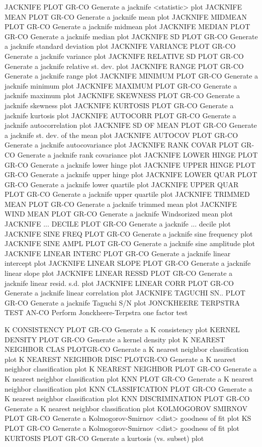JACKNIFE PLOT               GR-CO Generate a jacknife <statistic> plot
JACKNIFE MEAN PLOT          GR-CO Generate a jacknife mean plot
JACKNIFE MIDMEAN PLOT       GR-CO Generate a jacknife midmean plot
JACKNIFE MEDIAN PLOT        GR-CO Generate a jacknife median plot
JACKNIFE SD PLOT            GR-CO Generate a jacknife standard deviation plot
JACKNIFE VARIANCE PLOT      GR-CO Generate a jacknife variance plot
JACKNIFE RELATIVE SD PLOT   GR-CO Generate a jacknife relative st. dev. plot
JACKNIFE RANGE PLOT         GR-CO Generate a jacknife range plot
JACKNIFE MINIMUM PLOT       GR-CO Generate a jacknife minimum plot
JACKNIFE MAXIMUM PLOT       GR-CO Generate a jacknife maximum plot
JACKNIFE SKEWNESS PLOT      GR-CO Generate a jacknife skewness plot
JACKNIFE KURTOSIS PLOT      GR-CO Generate a jacknife kurtosis plot
JACKNIFE AUTOCORR PLOT      GR-CO Generate a jacknife autocorrelation plot
JACKNIFE SD OF MEAN PLOT    GR-CO Generate a jacknife st. dev. of the mean plot
JACKNIFE AUTOCOV PLOT       GR-CO Generate a jacknife autocovariance plot
JACKNIFE RANK COVAR PLOT    GR-CO Generate a jacknife rank covariance plot
JACKNIFE LOWER HINGE PLOT   GR-CO Generate a jacknife lower hinge plot
JACKNIFE UPPER HINGE PLOT   GR-CO Generate a jacknife upper hinge plot
JACKNIFE LOWER QUAR PLOT    GR-CO Generate a jacknife lower quartile plot
JACKNIFE UPPER QUAR PLOT    GR-CO Generate a jacknife upper quartile plot
JACKNIFE TRIMMED MEAN PLOT  GR-CO Generate a jacknife trimmed mean plot
JACKNIFE WIND MEAN PLOT     GR-CO Generate a jacknife Windsorized mean plot
JACKNIFE ... DECILE PLOT    GR-CO Generate a jacknife ... decile plot
JACKNIFE SINE FREQ PLOT     GR-CO Generate a jacknife sine frequency plot
JACKNIFE SINE AMPL PLOT     GR-CO Generate a jacknife sine amplitude plot
JACKNIFE LINEAR INTERC PLOT GR-CO Generate a jacknife linear intercept plot
JACKNIFE LINEAR SLOPE PLOT  GR-CO Generate a jacknife linear slope plot
JACKNIFE LINEAR RESSD PLOT  GR-CO Generate a jacknife linear resid. s.d. plot
JACKNIFE LINEAR CORR PLOT   GR-CO Generate a jacknife linear correlation plot
JACKNIFE TAGUCHI SN.. PLOT  GR-CO Generate a jacknife Taguchi S/N plot
JONCKHEERE TERPSTRA TEST    AN-CO Perform Jonckheere-Terpstra one factor test

K CONSISTENCY PLOT          GR-CO Generate a K consistency plot
KERNEL DENSITY PLOT         GR-CO Generate a kernel density plot
K NEAREST NEIGHBOR CLAS PLOTGR-CO Generate a K nearest neighbor classification plot
K NEAREST NEIGHBOR DISC PLOTGR-CO Generate a K nearest neighbor classification plot
K NEAREST NEIGHBOR PLOT     GR-CO Generate a K nearest neighbor classification plot
KNN PLOT                    GR-CO Generate a K nearest neighbor classification plot
KNN CLASSIFICATION PLOT     GR-CO Generate a K nearest neighbor classification plot
KNN DISCRIMINATION PLOT     GR-CO Generate a K nearest neighbor classification plot
KOLMOGOROV SMIRNOV PLOT     GR-CO Generate a Kolmogorov-Smirnov <dist> goodness of fit plot
KS PLOT                     GR-CO Generate a Kolmogorov-Smirnov <dist> goodness of fit plot
KURTOSIS PLOT               GR-CO Generate a kurtosis (vs. subset) plot

